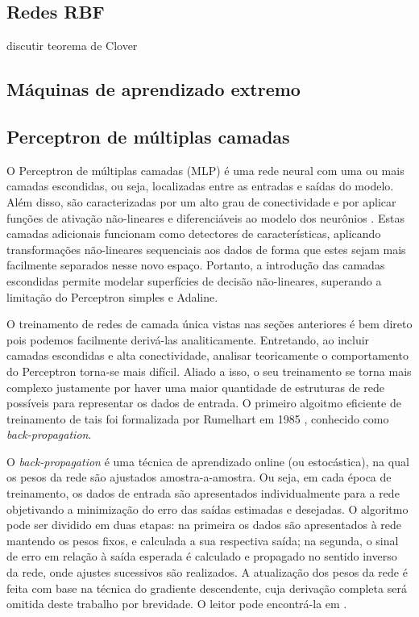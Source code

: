 \documentclass[conference]{IEEEtran}
\begin{document}
	\subsection{Redes RBF}
	discutir teorema de Clover
	
	
	\subsection{Máquinas de aprendizado extremo}
	
		

		
	\subsection{Perceptron de múltiplas camadas}
	
	O Perceptron de múltiplas camadas (MLP) é uma rede neural com uma ou mais camadas escondidas, ou seja, localizadas entre as entradas e saídas do modelo. Além disso, são caracterizadas por um alto grau de conectividade e por aplicar funções de ativação não-lineares e diferenciáveis ao modelo dos neurônios \cite{haykin2007neural}. Estas camadas adicionais funcionam como detectores de características, aplicando transformações não-lineares sequenciais aos dados de forma que estes sejam mais facilmente separados nesse novo espaço. Portanto, a introdução das camadas escondidas permite modelar superfícies de decisão não-lineares, superando a limitação do Perceptron simples e Adaline.
	
	O treinamento de redes de camada única vistas nas seções anteriores é bem direto pois podemos facilmente derivá-las analiticamente. Entretando, ao incluir camadas escondidas e alta conectividade, analisar teoricamente o comportamento do Perceptron torna-se mais difícil. Aliado a isso, o seu treinamento se torna mais complexo justamente por haver uma maior quantidade de estruturas de rede possíveis para representar os dados de entrada. O primeiro algoitmo eficiente de treinamento de tais foi formalizada por Rumelhart em 1985 \cite{rumelhart1985learning}, conhecido como \textit{back-propagation}.    
	
	O \textit{back-propagation} é uma técnica de aprendizado online (ou estocástica), na qual os pesos da rede são ajustados amostra-a-amostra. Ou seja, em cada época de treinamento, os dados de entrada são apresentados individualmente para a rede objetivando a minimização do erro das saídas estimadas e desejadas. O algoritmo pode ser dividido em duas etapas: na primeira os dados são apresentados à rede mantendo os pesos fixos, e calculada a sua respectiva saída; na segunda, o sinal de erro em relação à saída esperada é calculado e propagado no sentido inverso da rede, onde ajustes sucessivos são realizados. A atualização dos pesos da rede é feita com base na técnica do gradiente descendente, cuja derivação completa será omitida deste trabalho por brevidade. O leitor pode encontrá-la em \cite{rumelhart1985learning, haykin2007neural}. 
	
\end{document}
